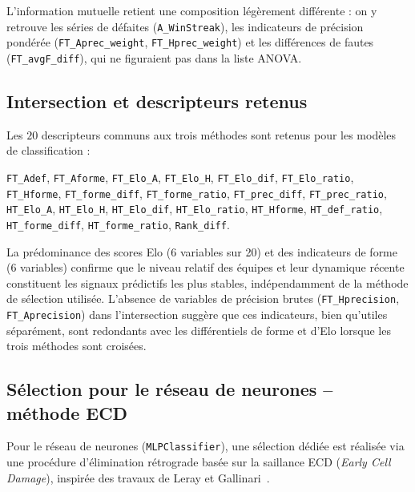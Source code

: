 L'information mutuelle retient une composition légèrement différente : 
on y retrouve les séries de défaites (\texttt{A\_WinStreak}), les indicateurs
de précision pondérée (\texttt{FT\_Aprec\_weight}, \texttt{FT\_Hprec\_weight}) et les
différences de fautes (\texttt{FT\_avgF\_diff}), qui ne figuraient pas dans la liste ANOVA.

\subsection{Intersection et descripteurs retenus}

Les $20$ descripteurs communs aux trois méthodes sont retenus pour les modèles de
classification :

\begin{center}
\texttt{FT\_Adef}, \texttt{FT\_Aforme}, \texttt{FT\_Elo\_A}, \texttt{FT\_Elo\_H},
\texttt{FT\_Elo\_dif}, \texttt{FT\_Elo\_ratio}, \texttt{FT\_Hforme},
\texttt{FT\_forme\_diff}, \texttt{FT\_forme\_ratio}, \texttt{FT\_prec\_diff},
\texttt{FT\_prec\_ratio}, \texttt{HT\_Elo\_A}, \texttt{HT\_Elo\_H},
\texttt{HT\_Elo\_dif}, \texttt{HT\_Elo\_ratio}, \texttt{HT\_Hforme},
\texttt{HT\_def\_ratio}, \texttt{HT\_forme\_diff}, \texttt{HT\_forme\_ratio},
\texttt{Rank\_diff}.
\end{center}

La prédominance des scores Elo (6 variables sur 20) et des indicateurs de forme
(6 variables) confirme que le niveau relatif des équipes et leur dynamique récente
constituent les signaux prédictifs les plus stables, indépendamment de la méthode de
sélection utilisée. L'absence de variables de précision brutes (\texttt{FT\_Hprecision},
\texttt{FT\_Aprecision}) dans l'intersection suggère que ces indicateurs, bien qu'utiles
séparément, sont redondants avec les différentiels de forme et d'Elo lorsque les trois
méthodes sont croisées.


\subsection{Sélection pour le réseau de neurones -- méthode ECD}

Pour le réseau de neurones (\texttt{MLPClassifier}), une sélection dédiée est réalisée
via une procédure d'élimination rétrograde basée sur la saillance ECD (\textit{Early Cell
Damage}), inspirée des travaux de Leray et Gallinari~\cite{leray}.

